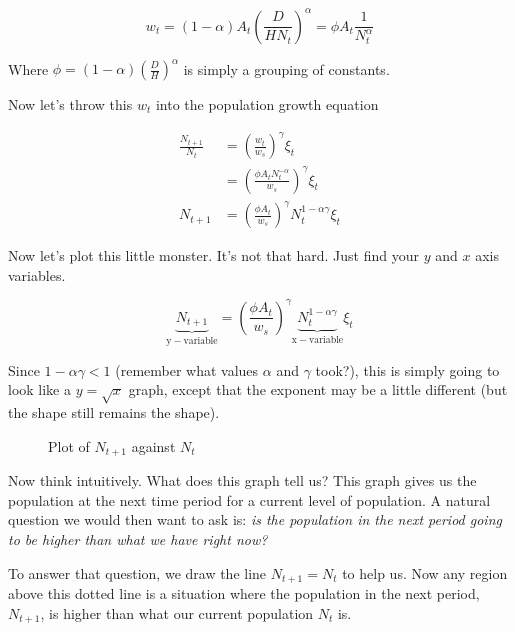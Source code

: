 \documentclass[11pt]{scrartcl}
\begin{document}
\[w_t = (1-\alpha)A_t\left(\frac{D}{HN_t}\right)^\alpha = \phi A_t \frac{1}{N_t^\alpha} \]

Where $\phi = (1-\alpha)\left(\frac{D}{H}\right)^\alpha$ is simply a grouping of constants.

Now let's throw this $w_t$ into the population growth equation

\begin{align*}
\frac{N_{t+1}}{N_t} &= \left(\frac{w_t}{w_s}\right)^\gamma \xi_t \\
&= \left(\frac{\phi A_tN_t^{-\alpha}}{w_s}\right)^\gamma \xi_t \\
N_{t+1} &= \left(\frac{\phi A_t}{w_s}\right)^\gamma N_t^{1-\alpha \gamma} \xi_t
\end{align*}

Now let's plot this little monster. It's not that hard. Just find your $y$ and $x$ axis variables.

\[ \underbrace{N_{t+1}}_\mathrm{y-variable} = \left(\frac{\phi A_t}{w_s}\right)^\gamma \underbrace{N_t^{1-\alpha \gamma}}_\mathrm{x-variable} \xi_t \]

Since $1-\alpha \gamma < 1$ (remember what values $\alpha$ and $\gamma$ took?), this is simply going to look like a $y = \sqrt{x}$ graph, except that the exponent may be a little different (but the shape still remains the shape). 

\begin{figure}[H]
\centering
{}
\caption{Plot of $N_{t+1}$ against $N_t$}
\end{figure}

Now think intuitively. What does this graph tell us? This graph gives us the population at the next time period for a current level of population. A natural question we would then want to ask is: \emph{is the population in the next period going to be higher than what we have right now?}

To answer that question, we draw the line $N_{t+1} = N_t$ to help us. Now any region above this dotted line is a situation where the population in the next period, $N_{t+1}$, is higher than what our current population $N_t$ is. 
\end{document}

